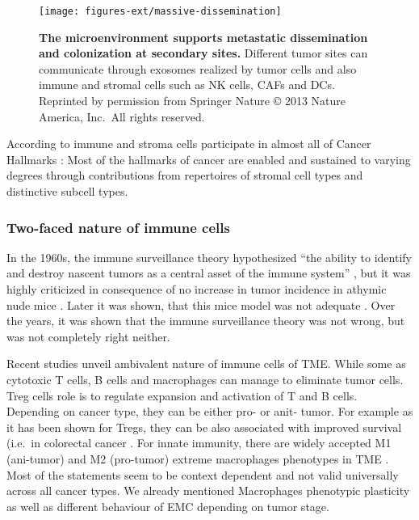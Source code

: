 \documentclass[12pt,]{book}
\theoremstyle{definition}
\theoremstyle{definition}
\theoremstyle{definition}
\theoremstyle{remark}
\begin{document}
\begin{figure}

{\centering \texttt{[image: figures-ext/massive-dissemination]} 

}

\caption{\textbf{The microenvironment supports metastatic
dissemination and colonization at secondary sites.} Different tumor
sites can communicate through exosomes realized by tumor cells and also
immune and stromal cells such as NK cells, CAFs and DCs. Reprinted by
permission from Springer Nature \citep{Quail2013} © 2013 Nature America,
Inc.~All rights reserved.}\label{fig:met-dis}
\end{figure}








According to \citep{Hanahan2012} immune and stroma cells participate in
almost all of Cancer Hallmarks \citep{Hanahan2000, Hanahan2012} : Most
of the hallmarks of cancer are enabled and sustained to varying degrees
through contributions from repertoires of stromal cell types and
distinctive subcell types.

\hypertarget{two-faced-nature-of-immune-cells}{%
\subsubsection{Two-faced nature of immune
cells}\label{two-faced-nature-of-immune-cells}}

In the 1960s, the immune surveillance theory hypothesized ``the ability
to identify and destroy nascent tumors as a central asset of the immune
system'' \citep{Sebeok1976, Burnet1970}, but it was highly criticized in
consequence of no increase in tumor incidence in athymic nude mice
\citep{Stutman1974, Rygaard1976}. Later it was shown, that this mice
model was not adequate \citep{Cavallo2011}. Over the years, it was shown
that the immune surveillance theory was not wrong, but was not
completely right neither.

Recent studies unveil ambivalent nature of immune cells of TME. While
some as cytotoxic T cells, B cells and macrophages can manage to
eliminate tumor cells. Treg cells role is to regulate expansion and
activation of T and B cells. Depending on cancer type, they can be
either pro- or anit- tumor. For example as it has been shown for Tregs,
they can be also associated with improved survival (i.e.~in colorectal
cancer \citep{Frey2010}. For innate immunity, there are widely accepted
M1 (ani-tumor) and M2 (pro-tumor) extreme macrophages phenotypes in TME
\citep{Qian2010}. Most of the statements seem to be context dependent
and not valid universally across all cancer types. We already mentioned
Macrophages phenotypic plasticity as well as different behaviour of EMC
depending on tumor stage.
\end{document}
